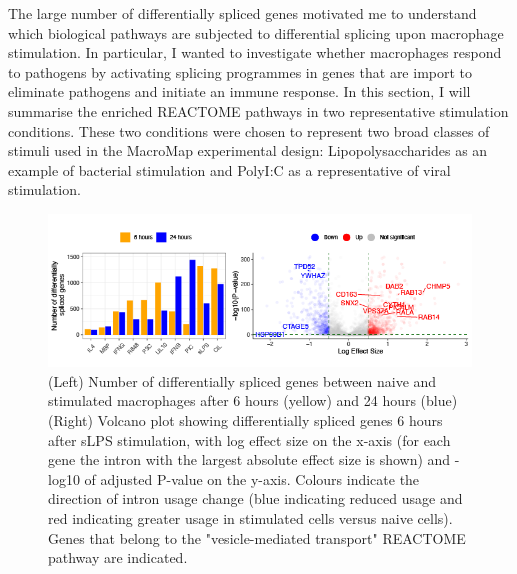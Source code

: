 The large number of differentially spliced genes motivated me to understand which biological pathways are subjected to differential splicing upon macrophage stimulation. In particular, I wanted to investigate whether macrophages respond to pathogens by activating splicing programmes in genes that are import to eliminate pathogens and initiate an immune response. In this section, I will summarise the enriched REACTOME pathways in two representative stimulation conditions. These two conditions were chosen to represent two broad classes of stimuli used in the MacroMap experimental design: Lipopolysaccharides as an example of bacterial stimulation and PolyI:C as a representative of viral stimulation.\\




\begin{figure}[H]
  \centering
  \includegraphics[width=\textwidth]{Vector/ds.png}
  \caption[Number of differentially spliced genes and volcano plot of differentially spliced genes in sLPS\_6]{(Left) Number of differentially spliced genes between naive and stimulated macrophages after 6 hours (yellow) and 24 hours (blue) (Right) Volcano plot showing differentially spliced genes 6 hours after sLPS stimulation, with log effect size on the x-axis (for each gene the intron with the largest absolute effect size is shown) and -log10 of adjusted P-value on the y-axis. Colours indicate the direction of intron usage change (blue indicating reduced usage and red indicating greater usage in stimulated cells versus naive cells). Genes that belong to the "vesicle-mediated transport" REACTOME pathway are indicated.}
  \label{fig:ds}   
\end{figure}
